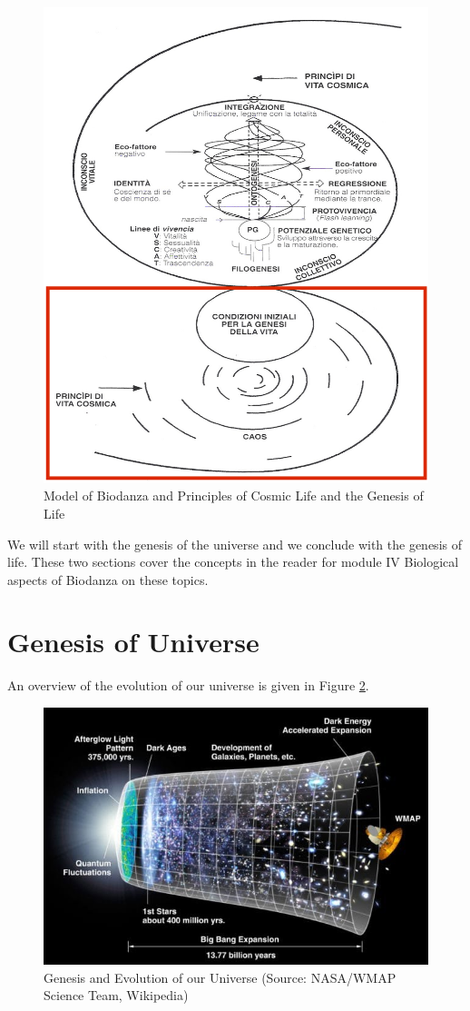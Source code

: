 \documentclass[
  11pt,
]{book}
\begin{document}
\begin{figure}

{\centering \includegraphics[width=0.5\linewidth]{./figs/biologischeAspectenBiodanzaDeelI} 

}

\caption{Model of Biodanza and Principles of Cosmic Life and the Genesis of Life}\label{fig:modelCosmic}
\end{figure}

We will start with the genesis of the universe and we conclude with the genesis of life. These two sections cover the concepts in the reader for module IV Biological aspects of Biodanza on these topics.

\hypertarget{genesis-of-universe}{%
\section{Genesis of Universe}\label{genesis-of-universe}}

An overview of the evolution of our universe is given in Figure \ref{fig:evolutionUniverse}.

\begin{figure}

{\centering \includegraphics[width=1\linewidth]{./figs/originKosmos} 

}

\caption{Genesis and Evolution of our Universe (Source: NASA/WMAP Science Team, Wikipedia)}\label{fig:evolutionUniverse}
\end{figure}
\end{document}
